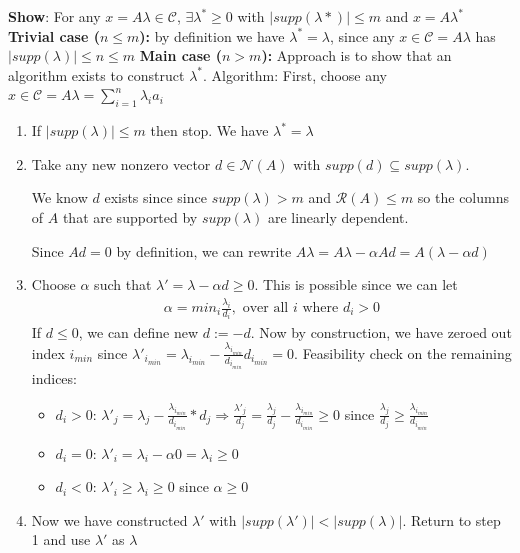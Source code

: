\documentclass[12pt]{exam}
\begin{document}
\begin{questions}
\begin{parts}
    \textbf{Show}: For any $x = A\lambda \in \mathcal{C}$, $\exists \lambda^*\geq 0$ with $|supp(\lambda*)| \leq m$ and $x = A\lambda^*$
    \newline\newline
    \textbf{Trivial case ($n \leq m$):} by definition we have $\lambda^* = \lambda$, since any $x \in \mathcal{C} = A\lambda$ has $|supp(\lambda)| \leq n \leq m$
    \newline\newline
    \textbf{Main case ($n > m$):} Approach is to show that an algorithm exists to construct $\lambda^*$. 
    \newline\newline Algorithm: First, choose any $x \in \mathcal{C} = A\lambda = \sum_{i=1}^n \lambda_ia_i$
    \begin{enumerate}
        \item If $|supp(\lambda)| \leq m$ then stop. We have $\lambda^* = \lambda$
        \item Take any new nonzero vector $d \in \mathcal{N}(A)$ with $supp(d) \subseteq supp(\lambda)$. 
        
        We know $d$ exists since since $supp(\lambda) > m$ and $\mathcal{R}(A) \leq m$ so the columns of $A$ that are supported by $supp(\lambda)$ are linearly dependent. 
        
        Since $Ad = 0$ by definition, we can rewrite $A\lambda = A\lambda - \alpha Ad = A(\lambda - \alpha d)$
        \item Choose $\alpha$ such that $\lambda' = \lambda - \alpha d \geq 0$. This is possible since we can let 
        \begin{align*}
            \alpha = min_i \frac{\lambda_i}{d_i}, \text{ over all } i \text{ where } d_i > 0
        \end{align*}
        If $d \leq 0$, we can define new $d := -d$. Now by construction, we have zeroed out index $i_{min}$ since $\lambda'_{i_{min}} = \lambda_{i_{min}} - \frac{\lambda_{i_{min}}}{d_{i_{min}}}d_{i_{min}} = 0$. Feasibility check on the remaining indices: 
        \begin{itemize}
            \item $d_i > 0$: $\lambda'_j = \lambda_j - \frac{\lambda_{i_{min}}}{d_{i_{min}}} * d_j \Longrightarrow \frac{\lambda'_j}{d_j} = \frac{\lambda_j}{d_j} - \frac{\lambda_{i_{min}}}{d_{i_{min}}} \geq 0$ since $\frac{\lambda_j}{d_j} \geq \frac{\lambda_{i_{min}}}{d_{i_{min}}}$
            \item $d_i = 0$: $\lambda'_i = \lambda_i - \alpha 0 = \lambda_i \geq 0$
            \item $d_i < 0$: $\lambda'_i \geq \lambda_i \geq 0$ since $\alpha \geq 0$
        \end{itemize}
        \item Now we have constructed $\lambda'$ with $|supp(\lambda')| < |supp(\lambda)|$. Return to step 1 and use $\lambda'$ as $\lambda$
    \end{enumerate} 


\end{parts}
\end{questions}
\end{document}
